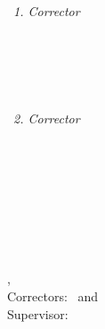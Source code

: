 \begin{titlepage}
	\vfill
	{\large \thesisSubject} \\[5mm]
	{\LARGE \color{ctcolortitle}\textbf{\thesisTitle} \\[10mm]}
	{\Large \thesisName} \\

	\vfill
	\begin{minipage}[t]{.27\textwidth}
		\raggedleft\
		\textit{1. Corrector}
	\end{minipage}
	\hspace*{15pt}
	\begin{minipage}[t]{.65\textwidth}
		{\Large \thesisFirstReviewer} \\
	  	{\small \thesisFirstReviewerDepartment} \\[-1mm]
		{\small \thesisFirstReviewerUniversity}
	\end{minipage} \\[5mm]
	\begin{minipage}[t]{.27\textwidth}
		\raggedleft\
		\textit{2. Corrector}
	\end{minipage}
	\hspace*{15pt}
	\begin{minipage}[t]{.65\textwidth}
		{\Large \thesisSecondReviewer} \\
	  	{\small \thesisSecondReviewerDepartment} \\[-1mm]
		{\small \thesisSecondReviewerUniversity}
	\end{minipage} \\[15mm]

	\thesisDate\\ %

\end{titlepage}


\hfill
\vfill
{
	\small
	\textbf{\thesisName} \\
	\textit{\thesisTitle} \\
	\thesisSubject, \thesisDate\\ %
	Correctors: \thesisFirstReviewer\ and \thesisSecondReviewer\\ %
	Supervisor: \thesisSupervisor\\[1.5em] %
	\textbf{\thesisUniversity} \\
	\textit{\thesisUniversityGroup} \\
	\thesisUniversityInstitute\\ %
	\thesisUniversityDepartment\\ %
	\thesisUniversityStreetAddress\\ %
	\thesisUniversityPostalCode\ \thesisUniversityCity\
}
